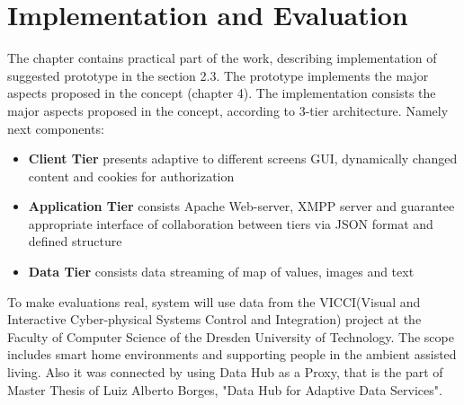 \chapter{Implementation and Evaluation}
	The chapter contains practical part of the work, describing implementation of suggested prototype in the section
	2.3. The prototype implements the major aspects proposed in the concept (chapter 4).
	The implementation consists the major aspects proposed in the concept, according to 3-tier architecture. Namely next components:
	 \begin{itemize}
		\item \textbf{Client Tier} presents adaptive to different screens GUI, dynamically changed content and cookies for authorization
		\item \textbf{Application Tier} consists Apache Web-server, XMPP server and guarantee appropriate interface of collaboration between tiers via JSON format and defined structure
		\item \textbf{Data Tier} consists data streaming of map of values, images and text
	\end{itemize}
	To make evaluations real, system will use data from the VICCI(Visual and Interactive Cyber-physical Systems Control and Integration) project at the Faculty of Computer Science of the Dresden University of Technology. The scope includes smart home environments and supporting people in the ambient assisted living. Also it was connected by using Data Hub as a Proxy, that is the part of Master Thesis of Luiz Alberto Borges, "Data Hub for Adaptive Data Services".

